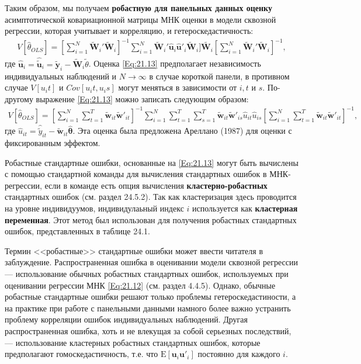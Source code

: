 Таким образом, мы получаем \textbf{робастную для панельных данных оценку} асимптотической ковариационной матрицы МНК оценки в  модели сквозной регрессии, которая учитывает и корреляцию, и гетероскедастичность:
 \begin{align}
V[\hat{\theta}_{OLS}]= \left[\sum^{N}_{i=1} \tilde{\mathbf W}_i'\tilde{\mathbf W}_i\right]^{-1} \sum^{N}_{i=1} \tilde{\mathbf W}_i' \hat{\mathbf u}_i \hat{\mathbf u}'_i\tilde{\mathbf W}_i]\tilde{\mathbf W_i} \left[\sum^{N}_{i=1} \tilde{\mathbf W}_i'\tilde{\mathbf W}_i\right]^{-1},
\label{Eq:21.13}
\end{align}
где $\hat{\mathbf u}_i=\hat{\tilde{\mathbf u}}_i=\tilde{\mathbf y}_i-\tilde{\mathbf W}_i \tilde{\theta}$. Оценка \ref{Eq:21.13} предполагает независимость индивидуальных наблюдений и $N \rightarrow \infty$ в случае короткой панели, в противном случае $V[u_it]$  и  $Cov[u_it, u_is]$ могут меняться в зависимости от $i, t$ и $s$. По-другому выражение \ref{Eq:21.13} можно записать следующим образом:
\begin{align}
V[\hat{\theta}_{OLS}]=\left[\sum^{N}_{i=1} \sum^{T}_{t=1} \tilde{\mathbf w}_{it}\tilde{\mathbf w}'_{it}\right]^{-1} \sum_{i=1}^{N} \sum_{t=1}^{T} \sum_{s=1}^T \tilde{\mathbf w}_{it}\tilde{\mathbf w}'_{is} \hat{u}_{it} \hat{ u}_{is} \left[\sum^{N}_{i=1} \sum^{T}_{t=1}\tilde{\mathbf w}_{it}\tilde{\mathbf w}'_{it}\right]^{-1}, 
\nonumber
\end{align}
где $\hat{u}_{it}=\hat{\tilde{y}}_{it}-\tilde{\mathbf w}_{it} \hat{\bm\theta}$. Эта оценка была предложена Ареллано (1987) для оценки с фиксированным эффектом.

Робастные стандартные ошибки, основанные на \ref{Eq:21.13} могут быть вычислены с помощью стандартной команды для вычисления стандартных ошибок в МНК-регрессии, если в команде есть опция вычисления \textbf{кластерно-робастных} стандартных ошибок (см. раздел 24.5.2). Так как кластеризация здесь проводится на уровне индивидуумов, индивидулаьный индекс $i$ используется как \textbf{кластерная переменная}. Этот метод был использован для получения робастных стандартных ошибок, представленных в таблице 24.1. %

Термин <<робастные>> стандартные ошибки может ввести читателя в заблуждение. Распространенная ошибка в оценивании модели сквозной регрессии --- использование обычных робастных стандартных ошибок, используемых при оценивании регрессии МНК \ref{Eq:21.12}  (см. раздел 4.4.5). Однако, обычные робастные стандартные ошибки решают только проблемы гетероскедастиности, а на практике при работе с панельными данными намного более важно устранить проблему корреляции ошибок  индивидуальных наблюдений. Другая распространенная ошибка, хоть и не влекущая за собой серьезных последствий, --- использование кластерных робастных стандартных ошибок, которые предполагают гомоскедастичность, т.е. что $\mathrm E[\mathbf u_i \mathbf u'_i]$ постоянно для каждого $i$.



